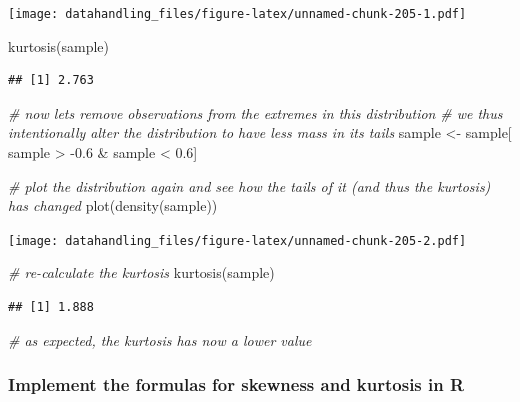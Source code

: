 \documentclass[
  12pt,
]{style/krantz}
\newenvironment{Shaded}{\begin{snugshade}}{\end{snugshade}}
\newcommand{\CommentTok}[1]{\textcolor[rgb]{0.56,0.35,0.01}{\textit{#1}}}
\newcommand{\FloatTok}[1]{\textcolor[rgb]{0.00,0.00,0.81}{#1}}
\newcommand{\FunctionTok}[1]{\textcolor[rgb]{0.00,0.00,0.00}{#1}}
\newcommand{\NormalTok}[1]{#1}
\newcommand{\OtherTok}[1]{\textcolor[rgb]{0.56,0.35,0.01}{#1}}
\newcommand{\SpecialCharTok}[1]{\textcolor[rgb]{0.00,0.00,0.00}{#1}}
\begin{document}
\texttt{[image: datahandling\_files/figure-latex/unnamed-chunk-205-1.pdf]}

\begin{Shaded}
\begin{Highlighting}[]
\FunctionTok{kurtosis}\NormalTok{(sample)}
\end{Highlighting}
\end{Shaded}

\begin{verbatim}
## [1] 2.763
\end{verbatim}

\begin{Shaded}
\begin{Highlighting}[]
\CommentTok{\# now lets remove observations from the extremes in this distribution}
\CommentTok{\# we thus intentionally alter the distribution to have less mass in its tails}
\NormalTok{sample }\OtherTok{\textless{}{-}}\NormalTok{ sample[ sample }\SpecialCharTok{\textgreater{}} \SpecialCharTok{{-}}\FloatTok{0.6} \SpecialCharTok{\&}\NormalTok{ sample }\SpecialCharTok{\textless{}} \FloatTok{0.6}\NormalTok{]}

\CommentTok{\# plot the distribution again and see how the tails of it (and thus the kurtosis) has changed}
\FunctionTok{plot}\NormalTok{(}\FunctionTok{density}\NormalTok{(sample))}
\end{Highlighting}
\end{Shaded}

\texttt{[image: datahandling\_files/figure-latex/unnamed-chunk-205-2.pdf]}

\begin{Shaded}
\begin{Highlighting}[]
\CommentTok{\# re{-}calculate the kurtosis}
\FunctionTok{kurtosis}\NormalTok{(sample)}
\end{Highlighting}
\end{Shaded}

\begin{verbatim}
## [1] 1.888
\end{verbatim}

\begin{Shaded}
\begin{Highlighting}[]
\CommentTok{\# as expected, the kurtosis has now a lower value}
\end{Highlighting}
\end{Shaded}

\hypertarget{implement-the-formulas-for-skewness-and-kurtosis-in-r}{%
\subsubsection{Implement the formulas for skewness and kurtosis in R}\label{implement-the-formulas-for-skewness-and-kurtosis-in-r}}
\end{document}
